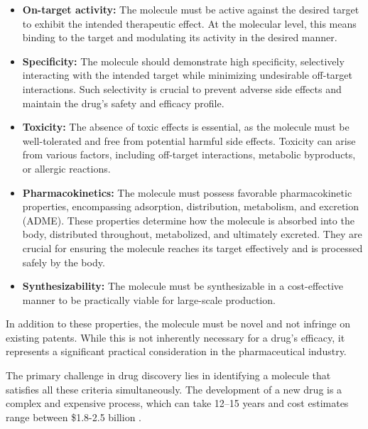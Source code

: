 \begin{itemize}
      \item \textbf{On-target activity:} The molecule must be active against the desired target to exhibit
            the intended therapeutic effect. At the molecular level, this means binding to the target and
            modulating its activity in the desired manner.
      \item \textbf{Specificity:} The molecule should demonstrate high specificity, selectively
            interacting with the intended target while minimizing undesirable off-target interactions. Such
            selectivity is crucial to prevent adverse side effects and maintain the drug's safety and efficacy
            profile.
      \item \textbf{Toxicity:} The absence of toxic effects is essential, as the molecule must be
            well-tolerated and free from potential harmful side effects. Toxicity can arise from various
            factors, including off-target interactions, metabolic byproducts, or allergic reactions.
      \item \textbf{Pharmacokinetics:} The molecule must possess favorable pharmacokinetic properties,
            encompassing adsorption, distribution, metabolism, and excretion (ADME). These properties determine
            how the molecule is absorbed into the body, distributed throughout, metabolized, and ultimately
            excreted. They are crucial for ensuring the molecule reaches its target effectively and is processed
            safely by the body.
      \item \textbf{Synthesizability:} The molecule must be synthesizable in a cost-effective manner to be
            practically viable for large-scale production.
\end{itemize}

In addition to these properties, the molecule must be novel and not infringe on existing patents.
While this is not inherently necessary for a drug's efficacy, it represents a significant practical
consideration in the pharmaceutical industry.

The primary challenge in drug discovery lies in identifying a molecule that satisfies all these
criteria simultaneously. The development of a new drug is a complex and expensive process, which can
take 12--15 years and cost estimates range between \$1.8-2.5 billion \citep{paulHowImproveProductivity2010,dimasiInnovationPharmaceuticalIndustry2016}.

